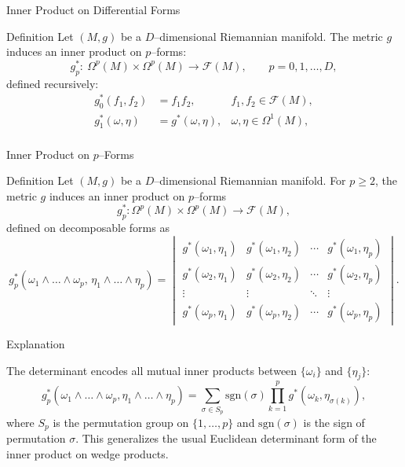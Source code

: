 \begin{frame}{Inner Product on Differential Forms}
\begin{block}{Definition}
Let $(M,g)$ be a $D$–dimensional Riemannian manifold.
The metric $g$ induces an inner product on $p$–forms:
\[
g^*_p:\ \Omega^p(M)\times \Omega^p(M)\to \mathcal{F}(M),
\qquad p=0,1,\dots,D,
\]
defined recursively:
\[
\begin{aligned}
g^*_0(f_1,f_2) &= f_1 f_2, & f_1,f_2\in\mathcal{F}(M),\\
g^*_1(\omega,\eta) &= g^*(\omega,\eta), & \omega,\eta\in\Omega^1(M),\\[2pt]
\end{aligned}
\]
\end{block}
\end{frame}

\begin{frame}{Inner Product on $p$–Forms}
\begin{block}{Definition}
Let $(M,g)$ be a $D$–dimensional Riemannian manifold.
For $p\ge2$, the metric $g$ induces an inner product on $p$–forms
\[
g^*_p:\Omega^p(M)\times\Omega^p(M)\longrightarrow\mathcal{F}(M),
\]
defined on decomposable forms as
\[
g^*_p(\omega_1\wedge\dots\wedge\omega_p,\,
\eta_1\wedge\dots\wedge\eta_p)
=
\begin{vmatrix}
g^*(\omega_1,\eta_1) & g^*(\omega_1,\eta_2) & \cdots & g^*(\omega_1,\eta_p)\\[4pt]
g^*(\omega_2,\eta_1) & g^*(\omega_2,\eta_2) & \cdots & g^*(\omega_2,\eta_p)\\[4pt]
\vdots & \vdots & \ddots & \vdots\\[4pt]
g^*(\omega_p,\eta_1) & g^*(\omega_p,\eta_2) & \cdots & g^*(\omega_p,\eta_p)
\end{vmatrix}.
\]
\end{block}
\end{frame}

\begin{frame}{Explanation}
\begin{block}{}
The determinant encodes all mutual inner products between $\{\omega_i\}$ and $\{\eta_j\}$:
\[
g^*_p(\omega_1\!\wedge\!\dots\!\wedge\!\omega_p,\eta_1\!\wedge\!\dots\!\wedge\!\eta_p)
=\!\!\sum_{\sigma\in S_p}\!\!\mathrm{sgn}(\sigma)
\prod_{k=1}^{p} g^*(\omega_k,\eta_{\sigma(k)}),
\]
where $S_p$ is the permutation group on $\{1,\dots,p\}$ and $\mathrm{sgn}(\sigma)$ is the sign of permutation $\sigma$.
This generalizes the usual Euclidean determinant form of the inner product on wedge products.
\end{block}

\begin{center}
\end{center}
\end{frame}


